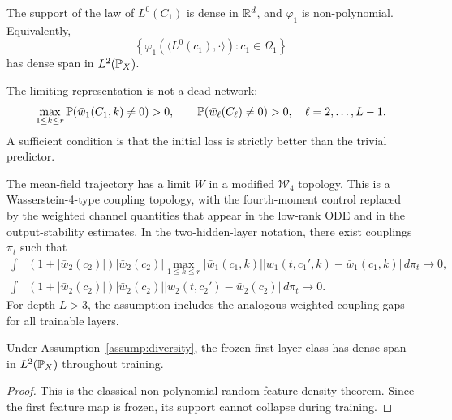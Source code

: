 \begin{assumption}
\label{assump:diversity}
The support of the law of $L^0(C_1)$ is dense in $\mathbb{R}^d$, and $\varphi_1$ is non-polynomial. Equivalently,
\begin{equation}
\left\{
\varphi_1\!\left(\langle L^0(c_1),\cdot\rangle\right):c_1\in\Omega_1
\right\}
\end{equation}
has dense span in $L^2(\mathbb{P}_X)$.
\end{assumption}

\begin{assumption}
\label{assump:lr}
The limiting representation is not a dead network:
\begin{equation}
\max_{1\le k\le r}\mathbb{P}(\bar w_1(C_1,k)\ne0)>0,
\qquad
\mathbb{P}(\bar w_\ell(C_\ell)\ne0)>0,\quad \ell=2,\ldots,L-1 .
\end{equation}
A sufficient condition is that the initial loss is strictly better than the trivial predictor.
\end{assumption}

\begin{assumption}
\label{assump:convergence}
The mean-field trajectory has a limit $\bar W$ in a modified $\mathcal W_4$ topology. This is a Wasserstein-4-type coupling topology, with the fourth-moment control replaced by the weighted channel quantities that appear in the low-rank ODE and in the output-stability estimates. In the two-hidden-layer notation, there exist couplings $\pi_t$ such that
\begin{align}
\int &(1+|\bar w_2(c_2)|)|\bar w_2(c_2)|
\max_{1\le k\le r}|\bar w_1(c_1,k)|
|w_1(t,c_1',k)-\bar w_1(c_1,k)|\,d\pi_t
\to0,
\label{eq:conv-w1-neurips}\\
\int &(1+|\bar w_2(c_2)|)|\bar w_2(c_2)|
|w_2(t,c_2')-\bar w_2(c_2)|\,d\pi_t
\to0 .
\label{eq:conv-w2-neurips}
\end{align}
For depth $L>3$, the assumption includes the analogous weighted coupling gaps for all trainable layers.
\end{assumption}

\begin{theorem}
\label{thm:uap-automatic}
Under Assumption~\ref{assump:diversity}, the frozen first-layer class has dense span in $L^2(\mathbb{P}_X)$ throughout training.
\end{theorem}

\begin{proof}
This is the classical non-polynomial random-feature density theorem. Since the first feature map is frozen, its support cannot collapse during training.
\end{proof}

